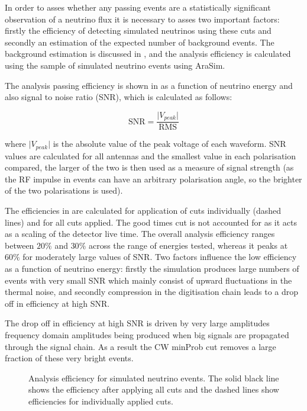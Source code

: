 In order to asses whether any passing events are a statistically significant observation of a neutrino flux it is necessary to asses two important factors: firstly the efficiency of detecting simulated neutrinos using these cuts and secondly an estimation of the expected number of background events. The background estimation is discussed in , and the analysis efficiency is calculated using the sample of simulated neutrino events using AraSim.

The analysis passing efficiency is shown in  as a function of neutrino energy and also signal to noise ratio (SNR), which is calculated as follows:

\begin{equation}
  \mbox{SNR} = \frac{\lvert V_{peak} \rvert}{\mbox{RMS}}
\end{equation}

\noindent where $\lvert V_{peak} \rvert$ is the absolute value of the peak voltage of each waveform. SNR values are calculated for all antennas and the smallest value in each polarisation compared, the larger of the two is then used as a measure of signal strength (as the RF impulse in events can have an arbitrary polarisation angle, so the brighter of the two polarisations is used).

The efficiencies in  are calculated for application of cuts individually (dashed lines) and for all cuts applied. The good times cut is not accounted for as it acts as a scaling of the detector live time. The overall analysis efficiency ranges between $20 \%$ and $30 \%$ across the range of energies tested, whereas it peaks at $60 \%$ for moderately large values of SNR. Two factors influence the low efficiency as a function of neutrino energy: firstly the simulation produces large numbers of events with very small SNR which mainly consist of upward fluctuations in the thermal noise, and secondly compression in the digitisation chain leads to a drop off in efficiency at high SNR. 

The drop off in efficiency at high SNR is driven by very large amplitudes frequency domain amplitudes being produced when big signals are propagated through the signal chain. As a result the CW minProb cut removes a large fraction of these very bright events. 


\begin{figure}[htpb]
\hfill
{}
\caption{Analysis efficiency for simulated neutrino events. The solid black line shows the efficiency after applying all cuts and the dashed lines show efficiencies for individually applied cuts.}
\label{fig:Analysis:Cut-Results:Efficiency}
\end{figure}


